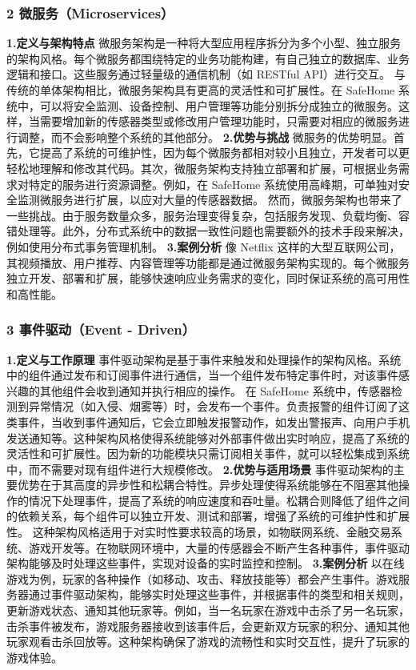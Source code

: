 \subsubsection{2 微服务（Microservices）}\label{ux5faeux670dux52a1microservices} \textbf{1.定义与架构特点}
微服务架构是一种将大型应用程序拆分为多个小型、独立服务的架构风格。每个微服务都围绕特定的业务功能构建，有自己独立的数据库、业务逻辑和接口。这些服务通过轻量级的通信机制（如 RESTful API）进行交互。
与传统的单体架构相比，微服务架构具有更高的灵活性和可扩展性。在 SafeHome
系统中，可以将安全监测、设备控制、用户管理等功能分别拆分成独立的微服务。这样，当需要增加新的传感器类型或修改用户管理功能时，只需要对相应的微服务进行调整，而不会影响整个系统的其他部分。 \textbf{2.优势与挑战}
微服务的优势明显。首先，它提高了系统的可维护性，因为每个微服务都相对较小且独立，开发者可以更轻松地理解和修改其代码。其次，微服务架构支持独立部署和扩展，可根据业务需求对特定的服务进行资源调整。例如，在 SafeHome
系统使用高峰期，可单独对安全监测微服务进行扩展，以应对大量的传感器数据。
然而，微服务架构也带来了一些挑战。由于服务数量众多，服务治理变得复杂，包括服务发现、负载均衡、容错处理等。此外，分布式系统中的数据一致性问题也需要额外的技术手段来解决，例如使用分布式事务管理机制。 \textbf{3.案例分析} 像
Netflix 这样的大型互联网公司，其视频播放、用户推荐、内容管理等功能都是通过微服务架构实现的。每个微服务独立开发、部署和扩展，能够快速响应业务需求的变化，同时保证系统的高可用性和高性能。 \subsubsection{3
事件驱动（Event - Driven）}\label{ux4e8bux4ef6ux9a71ux52a8event---driven} \textbf{1.定义与工作原理}
事件驱动架构是基于事件来触发和处理操作的架构风格。系统中的组件通过发布和订阅事件进行通信，当一个组件发布特定事件时，对该事件感兴趣的其他组件会收到通知并执行相应的操作。 在 SafeHome
系统中，传感器检测到异常情况（如入侵、烟雾等）时，会发布一个事件。负责报警的组件订阅了这类事件，当收到事件通知后，它会立即触发报警动作，如发出警报声、向用户手机发送通知等。这种架构风格使得系统能够对外部事件做出实时响应，提高了系统的灵活性和可扩展性。因为新的功能模块只需订阅相关事件，就可以轻松集成到系统中，而不需要对现有组件进行大规模修改。
\textbf{2.优势与适用场景}
事件驱动架构的主要优势在于其高度的异步性和松耦合特性。异步处理使得系统能够在不阻塞其他操作的情况下处理事件，提高了系统的响应速度和吞吐量。松耦合则降低了组件之间的依赖关系，每个组件可以独立开发、测试和部署，增强了系统的可维护性和扩展性。
这种架构风格适用于对实时性要求较高的场景，如物联网系统、金融交易系统、游戏开发等。在物联网环境中，大量的传感器会不断产生各种事件，事件驱动架构能够及时处理这些事件，实现对设备的实时监控和控制。 \textbf{3.案例分析}
以在线游戏为例，玩家的各种操作（如移动、攻击、释放技能等）都会产生事件。游戏服务器通过事件驱动架构，能够实时处理这些事件，并根据事件的类型和相关规则，更新游戏状态、通知其他玩家等。例如，当一名玩家在游戏中击杀了另一名玩家，击杀事件被发布，游戏服务器接收到该事件后，会更新双方玩家的积分、通知其他玩家观看击杀回放等。这种架构确保了游戏的流畅性和实时交互性，提升了玩家的游戏体验。
